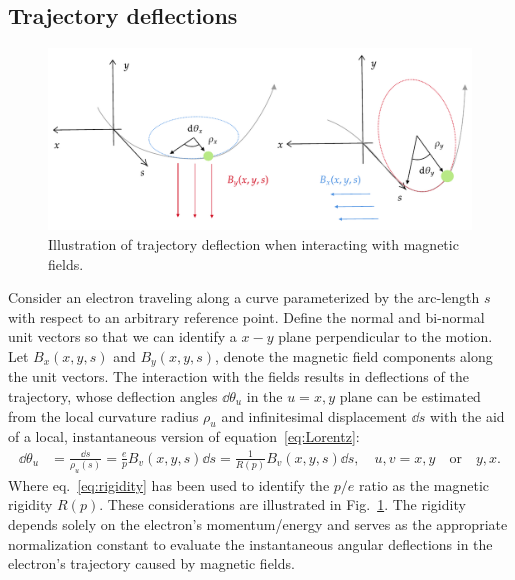 \subsection{Trajectory deflections}
\begin{figure}[htb]
    \centering
    \includegraphics[width=\textwidth]{Images/deflections.pdf}
    \caption[Illustration of trajectory deflection when interacting with magnetic fields.]{Illustration of trajectory deflection when interacting with magnetic fields.}
    \label{fig:deflec_angles}
\end{figure}
Consider an electron traveling along a curve parameterized by the arc-length $s$ with respect to an arbitrary reference point. Define the normal and bi-normal unit vectors so that we can identify a $x-y$ plane perpendicular to the motion.  Let $B_x(x,y,s)$  and $B_y(x,y,s)$, denote the magnetic field components along the unit vectors. The interaction with the fields results in deflections of the trajectory, whose deflection angles $\dd\theta_u$ in the $u=x,y$ plane can be estimated from the local curvature radius $\rho_u$ and infinitesimal displacement $\dd{s}$ with the aid of a local, instantaneous version of equation~\eqref{eq:Lorentz}:
    \begin{equation}
        \begin{aligned}
            \dd{\theta_u} & = \frac{\dd{s}}{\rho_u(s)} = \frac{e}{p}B_v(x,y,s)\dd s = \frac{1}{R(p)}B_v(x,y,s)\dd s, \quad u,v=x, y \quad\text{or}\quad y,x.
        \end{aligned}
        \label{eq:deflec_angles}
    \end{equation}
Where eq.~\eqref{eq:rigidity} has been used to identify the $p/e$ ratio as the magnetic rigidity $R(p)$. These considerations are illustrated in Fig.~\ref{fig:deflec_angles}. The rigidity depends solely on the electron's momentum/energy and serves as the appropriate normalization constant to evaluate the instantaneous angular deflections in the electron's trajectory caused by magnetic fields.
